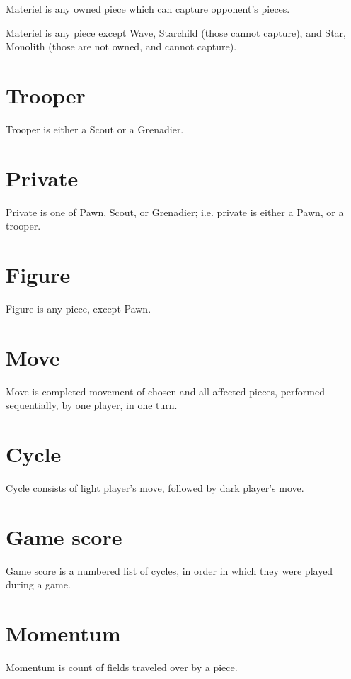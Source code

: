 Materiel is any owned piece which can capture opponent's pieces.

Materiel is any piece except Wave, Starchild (those cannot capture),
and Star, Monolith (those are not owned, and cannot capture).

\section*{Trooper}
\label{sec:Terms/Trooper}
Trooper is either a Scout or a Grenadier.

\section*{Private}
\label{sec:Terms/Private}
Private is one of Pawn, Scout, or Grenadier; i.e. private is either a Pawn,
or a trooper.

\section*{Figure}
\label{sec:Terms/Figure}
Figure is any piece, except Pawn.

\section*{Move}
\label{sec:Terms/Move}
Move is completed movement of chosen and all affected pieces, performed
sequentially, by one player, in one turn.

\section*{Cycle}
\label{sec:Terms/Cycle}
Cycle consists of light player's move, followed by dark player's move.

\section*{Game score}
\label{sec:Terms/Game score}
Game score is a numbered list of cycles, in order in which they were played
during a game.

\section*{Momentum}
\label{sec:Terms/Momentum}
Momentum is count of fields traveled over by a piece.


